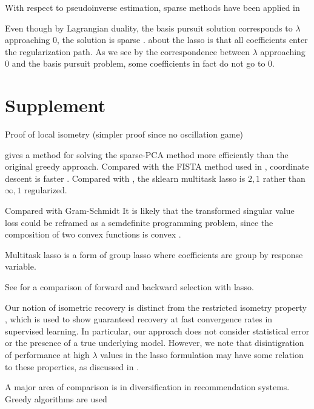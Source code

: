 \documentclass[a4paper,11pt]{article}
\begin{document}
With respect to pseudoinverse estimation, sparse methods have been applied in \cite{Sun2012-vp}

Even though by Lagrangian duality, the basis pursuit solution corresponds to $\lambda$ approaching $0$, the solution is sparse \cite{Tropp04-ju}.
about the lasso is that all coefficients enter the regularization path.
As we see by the correspondence between $\lambda$ approaching $0$ and the basis pursuit problem, some coefficients in fact do not go to $0$. 
\section{Supplement}


Proof of local isometry (simpler proof since no oscillation game)


\cite{Bertsimas2022-qo} gives a method for solving the sparse-PCA method more efficiently than the original greedy approach.
Compared with the FISTA method used in  \cite{Koelle2022-ju, Koelle2024-no}, coordinate descent \cite{Friedman-2007-yb, Meier2008-ts, Qin2013-tx} is faster \cite{Catalina2018-ek, Zhao2023-xn}.
Compared with \cite{Liu2009-yo}, the sklearn multitask lasso is $2,1$ rather than $\infty,1$ regularized.

Compared with Gram-Schmidt
It is likely that the transformed singular value loss could be reframed as a semdefinite programming problem, since the composition of two convex functions is convex \cite{Boyd2004-ql}.

Multitask lasso \cite{Obozinski2006-kq, Yeung2011-fg} is a form of group lasso \cite{Yuan2006-bt} where coefficients are group by response variable.

See \cite{Obozinski2006-kq} for a comparison of forward and backward selection with lasso.

Our notion of isometric recovery is distinct from the restricted isometry property \cite{Candes2005-dd, Hastie2015-qa}, which is used to show guaranteed recovery at fast convergence rates in supervised learning.
In particular, our approach does not consider statistical error or the presence of a true underlying model.
However, we note that disintigration of performance at high $\lambda$ values in the lasso formulation may have some relation to these properties, as discussed in \cite{Koelle2022-ju, Koelle2024-no}.


A major area of comparison is in diversification in recommendation systems.  Greedy algorithms are used \cite{Carbonell2017-gi, Wu2019-uk}
\end{document}
